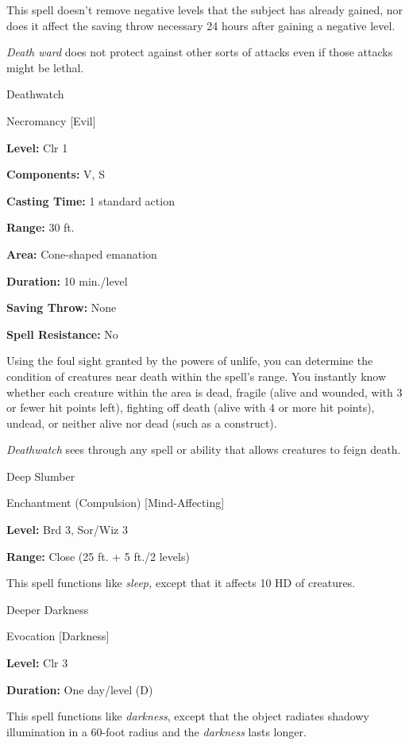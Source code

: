 \documentclass{article}
\begin{document}
This spell doesn't remove negative levels that the subject has already gained, 
nor does it affect the saving throw necessary 24 hours after gaining a negative 
level.

\textit{Death ward }does not protect against other sorts of attacks even if those 
attacks might be lethal.

\vspace{12pt}
Deathwatch

Necromancy [Evil]

\textbf{Level:} Clr 1

\textbf{Components:} V, S

\textbf{Casting Time:} 1 standard action

\textbf{Range:} 30 ft.

\textbf{Area:} Cone-shaped emanation

\textbf{Duration:} 10 min./level

\textbf{Saving Throw:} None

\textbf{Spell Resistance:} No

Using the foul sight granted by the powers of unlife, you can determine the condition 
of creatures near death within the spell's range. You instantly know whether each 
creature within the area is dead, fragile (alive and wounded, with 3 or fewer hit 
points left), fighting off death (alive with 4 or more hit points), undead, or 
neither alive nor dead (such as a construct).

\textit{Deathwatch }sees through any spell or ability that allows creatures to 
feign death.

\vspace{12pt}
Deep Slumber

Enchantment (Compulsion) [Mind-Affecting]

\textbf{Level:} Brd 3, Sor/Wiz 3

\textbf{Range:} Close (25 ft. + 5 ft./2 levels)

This spell functions like \textit{sleep, }except that it affects 10 HD of creatures.

\vspace{12pt}
Deeper Darkness

Evocation [Darkness]

\textbf{Level:} Clr 3

\textbf{Duration:} One day/level (D)

This spell functions like \textit{darkness}, except that the object radiates shadowy 
illumination in a 60-foot radius and the \textit{darkness }lasts longer.
\end{document}
